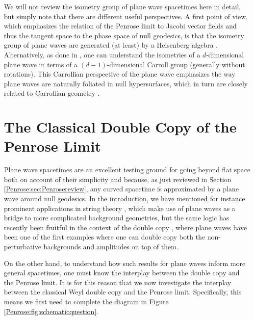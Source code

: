 We will not review the isometry group of plane wave spacetimes here in detail, but simply note that there are different useful perspectives. A first point of view, which emphasizes the relation of the Penrose limit to Jacobi vector fields and thus the tangent space to the phase space of null geodesics, is that the isometry group of plane waves are generated (at least) by a Heisenberg algebra \cite{blau2011plane}. Alternatively, as done in  \cite{Duval:2017els}, one can understand the isometries of a $d$-dimensional plane wave in terms of a $(d-1)$-dimensional Carroll group (generally without rotations). This Carrollian perspective of the plane wave emphasizes the way plane waves are naturally foliated in null hypersurfaces, which in turn are closely related to Carrollian geometry \cite{Ciambelli:2023mir}.

\section{The Classical Double Copy of the Penrose Limit}\label{Penrose:sec:dcandPenrose}

Plane wave spacetimes are an excellent testing ground for going beyond flat space both on account of their simplicity and because, as just reviewed in Section \ref{Penrose:sec:Penrosereview}, any curved spacetime is approximated by a plane wave around null geodesics. In the introduction, we have mentioned for instance prominent applications in string theory \cite{Horowitz:1989bv,Horowitz:1990sr,Kiritsis:1993jk,Russo:2002rq,Papadopoulos:2002bg,Berenstein:2002jq,Eberhardt:2018exh}, which make use of plane waves as a bridge to more complicated background geometries, but the same logic has recently been fruitful in the context of the double copy \cite{Adamo:2017nia,Adamo:2018mpq,Adamo:2020qru}, where plane waves have been one of the first examples where one can double copy both the non-perturbative backgrounds and amplitudes on top of them. 

On the other hand, to understand how such results for plane waves inform more general spacetimes, one must know the interplay between the double copy and the Penrose limit. It is for this reason that we now investigate the interplay between the classical Weyl double copy and the Penrose limit. Specifically, this means we first need to complete the diagram in Figure \ref{Penrose:fig:schematicquestion}.

